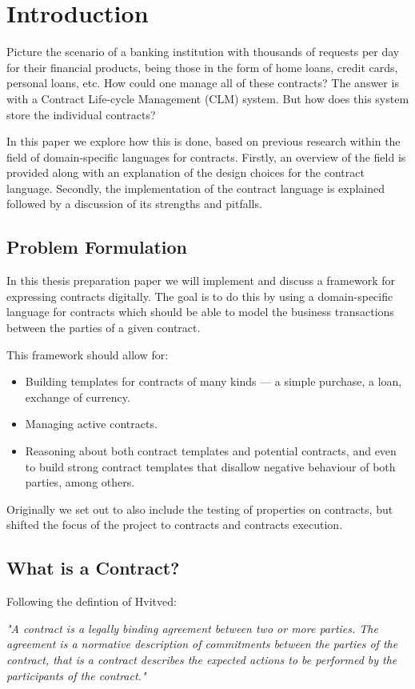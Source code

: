 \documentclass{ituthesis}
\begin{document}
\chapter{Introduction}

Picture the scenario of a banking institution with thousands of requests per day for their financial products, being those in the form of home loans, credit cards, personal loans, etc. How could one manage all of these contracts? The answer is with a Contract Life-cycle Management (CLM) system. But how does this system store the individual contracts?

In this paper we explore how this is done, based on previous research within the field of domain-specific languages for contracts. Firstly, an overview of the field is provided along with an explanation of the design choices for the contract language. Secondly, the implementation of the contract language is explained followed by a discussion of its strengths and pitfalls.

\section{Problem Formulation}
In this thesis preparation paper we will implement and discuss a framework for expressing contracts digitally. The goal is to do this by using a domain-specific language for contracts which should be able to model the business transactions between the parties of a given contract.

This framework should allow for:
\begin{itemize}
    \item Building templates for contracts of many kinds --- a simple purchase, a loan, exchange of currency.
    \item Managing active contracts.
    \item Reasoning about both contract templates and potential contracts, and even to build strong contract templates that disallow negative behaviour of both parties, among others.
\end{itemize}
Originally we set out to also include the testing of properties on contracts, but shifted the focus of the project to contracts and contracts execution.

\section{What is a Contract?}
\label{contract}
Following the defintion of Hvitved:
\begin{displayquote}
\textit{"A contract is a legally binding agreement between two or more parties. The agreement is a normative description of commitments between the parties of the contract, that is a contract describes the expected actions to be performed by the participants of the contract."}
\cite{hvitved2011contract}
\end{displayquote}
\end{document}
